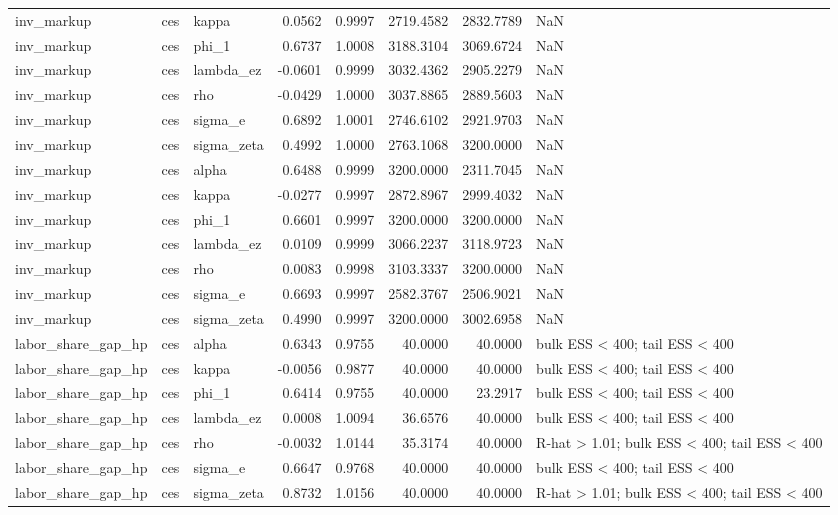 \begin{tabular}{lllrrrrl}
inv\_markup & ces & kappa & 0.0562 & 0.9997 & 2719.4582 & 2832.7789 & NaN \\
inv\_markup & ces & phi\_1 & 0.6737 & 1.0008 & 3188.3104 & 3069.6724 & NaN \\
inv\_markup & ces & lambda\_ez & -0.0601 & 0.9999 & 3032.4362 & 2905.2279 & NaN \\
inv\_markup & ces & rho & -0.0429 & 1.0000 & 3037.8865 & 2889.5603 & NaN \\
inv\_markup & ces & sigma\_e & 0.6892 & 1.0001 & 2746.6102 & 2921.9703 & NaN \\
inv\_markup & ces & sigma\_zeta & 0.4992 & 1.0000 & 2763.1068 & 3200.0000 & NaN \\
inv\_markup & ces & alpha & 0.6488 & 0.9999 & 3200.0000 & 2311.7045 & NaN \\
inv\_markup & ces & kappa & -0.0277 & 0.9997 & 2872.8967 & 2999.4032 & NaN \\
inv\_markup & ces & phi\_1 & 0.6601 & 0.9997 & 3200.0000 & 3200.0000 & NaN \\
inv\_markup & ces & lambda\_ez & 0.0109 & 0.9999 & 3066.2237 & 3118.9723 & NaN \\
inv\_markup & ces & rho & 0.0083 & 0.9998 & 3103.3337 & 3200.0000 & NaN \\
inv\_markup & ces & sigma\_e & 0.6693 & 0.9997 & 2582.3767 & 2506.9021 & NaN \\
inv\_markup & ces & sigma\_zeta & 0.4990 & 0.9997 & 3200.0000 & 3002.6958 & NaN \\
labor\_share\_gap\_hp & ces & alpha & 0.6343 & 0.9755 & 40.0000 & 40.0000 & bulk ESS < 400; tail ESS < 400 \\
labor\_share\_gap\_hp & ces & kappa & -0.0056 & 0.9877 & 40.0000 & 40.0000 & bulk ESS < 400; tail ESS < 400 \\
labor\_share\_gap\_hp & ces & phi\_1 & 0.6414 & 0.9755 & 40.0000 & 23.2917 & bulk ESS < 400; tail ESS < 400 \\
labor\_share\_gap\_hp & ces & lambda\_ez & 0.0008 & 1.0094 & 36.6576 & 40.0000 & bulk ESS < 400; tail ESS < 400 \\
labor\_share\_gap\_hp & ces & rho & -0.0032 & 1.0144 & 35.3174 & 40.0000 & R-hat > 1.01; bulk ESS < 400; tail ESS < 400 \\
labor\_share\_gap\_hp & ces & sigma\_e & 0.6647 & 0.9768 & 40.0000 & 40.0000 & bulk ESS < 400; tail ESS < 400 \\
labor\_share\_gap\_hp & ces & sigma\_zeta & 0.8732 & 1.0156 & 40.0000 & 40.0000 & R-hat > 1.01; bulk ESS < 400; tail ESS < 400 \\

\end{tabular}
